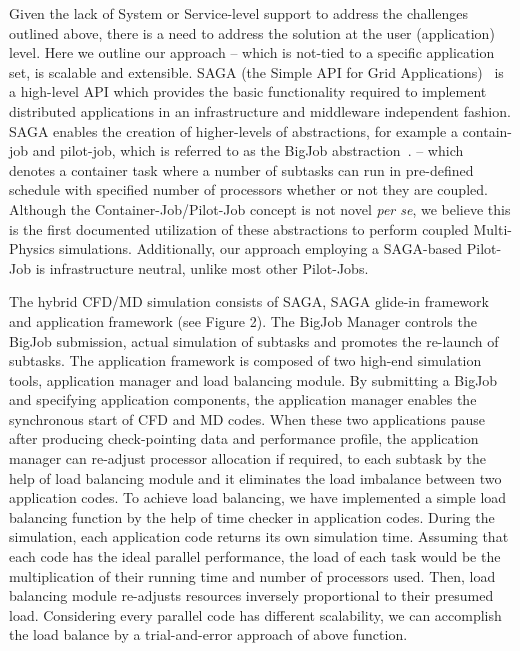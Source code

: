 \documentclass[a4paper]{article}
\begin{document}
Given the lack of System or Service-level support to address the challenges outlined above, there is a need to address the solution at the user (application) level.  Here we outline our approach -- which is not-tied to a specific application set, is scalable and extensible. SAGA (the Simple API for Grid Applications)~\cite{Jha:2008} is a high-level API which provides the basic functionality required to implement distributed applications in an infrastructure and middleware independent fashion.
SAGA enables the creation of higher-levels of abstractions, for example a contain-job and pilot-job, which is referred to as the BigJob abstraction~\cite{Jha:2009}.
-- which denotes a container task where a number of subtasks can run in pre-defined schedule with specified number of processors whether or not they are coupled.  Although the Container-Job/Pilot-Job concept is not novel {\it per se}, we believe this is the first documented utilization of these abstractions to perform coupled Multi-Physics simulations. Additionally, our approach employing a SAGA-based Pilot-Job is infrastructure neutral, unlike most other Pilot-Jobs.

The hybrid CFD/MD simulation consists of SAGA, SAGA glide-in framework and application framework (see Figure 2).  The BigJob Manager controls the BigJob submission, actual simulation of subtasks and promotes the re-launch of subtasks. The application framework is composed of two high-end simulation tools, application manager and load balancing module. By submitting a BigJob and specifying application components, the application manager enables the synchronous start of CFD and MD codes. When these two applications pause after producing check-pointing data and performance profile, the application manager can re-adjust processor allocation if required, to each subtask by the help of load balancing module and it eliminates the load imbalance between two application codes.  To achieve load balancing, we have implemented a simple load balancing function by the help of time checker in application codes. During the simulation, each application code returns its own simulation time. Assuming that each code has the ideal parallel performance, the load of each task would be the multiplication of their running time and number of processors used. Then, load balancing module re-adjusts resources inversely proportional to their presumed load. Considering every parallel code has different scalability, we can accomplish the load balance by a trial-and-error approach of above function.
\end{document}
